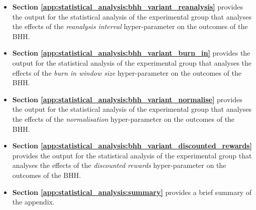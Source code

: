 \begin{itemize}
	\item \textbf{Section \ref{app:statistical_analysis:bhh_variant_reanalysis}} provides the output for the statistical analysis of the experimental group that analyses the effects of the \textit{reanalysis interval} hyper-parameter on the outcomes of the \acs{BHH}.

	\item \textbf{Section \ref{app:statistical_analysis:bhh_variant_burn_in}} provides the output for the statistical analysis of the experimental group that analyses the effects of the \textit{burn in window size} hyper-parameter on the outcomes of the \acs{BHH}.

	\item \textbf{Section \ref{app:statistical_analysis:bhh_variant_normalise}} provides the output for the statistical analysis of the experimental group that analyses the effects of the \textit{normalisation} hyper-parameter on the outcomes of the \acs{BHH}.

	\item \textbf{Section \ref{app:statistical_analysis:bhh_variant_discounted_rewards}} provides the output for the statistical analysis of the experimental group that analyses the effects of the \textit{discounted rewards} hyper-parameter on the outcomes of the \acs{BHH}.

	\item \textbf{Section \ref{app:statistical_analysis:summary}} provides a brief summary of the appendix.
\end{itemize}



